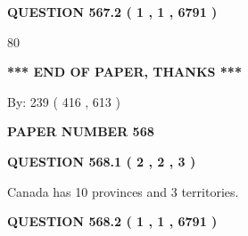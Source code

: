 \documentclass[12pt]{article}
\begin{document}
 
 
 
  
\vspace{0.2in}
  
{\textbf{\Large{QUESTION
567.2 
 ( 1 , 1 , 6791 )
}}}
  
  
 
 
\noindent{}

80
 
 
   
   
 \vspace{0.2in}
 
   
   
   
   
\vspace{1.0in} 
{\textbf{\large{ *** END OF PAPER, THANKS *** }}} 
   
   
\hspace{1.0in} By: 
 239 ( 416 ,  613 )
   
   
   
   
\newpage 
\setcounter{page}{ 
   568001 } 
   
   
   
   
 {\textbf{ \Large{ PAPER NUMBER  568  }}}
   
   
\vspace{0.2in}
   
   
   
   
   
   
 \vspace{0.2in}
 
 
 
 
   
   
  
\vspace{0.2in}
  
{\textbf{\Large{QUESTION
568.1 
 ( 2 , 2 , 3 )
}}}
  
  
 
 
\noindent{}
 
 
Canada has 10  provinces and 3 territories.
 
 
 
 
  
\vspace{0.2in}
  
{\textbf{\Large{QUESTION
568.2 
 ( 1 , 1 , 6791 )
}}}
  
\end{document}
